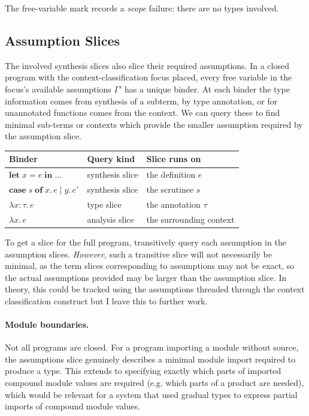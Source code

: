 The free-variable mark records a \emph{scope} failure: there are no types involved.

\subsection{\no Assumption Slices}
\label{sec:marking-assumption-slices}

The involved synthesis slices also slice their required assumptions. In a closed program with the context-classification focus placed,
every free variable in the focus's available assumptions $\Gamma'$ has a unique binder. At each binder the type information comes from synthesis of a subterm, by type annotation, or for unannotated functions comes from the context. We can query these to find minimal sub-terms or contexts which provide the smaller assumption required by the assumption slice.

\begin{center}
\small
\begin{tabular}{lll}
\toprule
\textbf{Binder} & \textbf{Query kind} & \textbf{Slice runs on} \\
\midrule
$\mathbf{let}\;x = e\;\mathbf{in}\;\ldots$            & synthesis slice & the definition $e$ \\
$\mathbf{case}\;s\;\mathbf{of}\;x.\,e \mid y.\,e'$    & synthesis slice & the scrutinee $s$ \\
$\lambda x{:}\tau.\,e$                                & type slice & the annotation $\tau$ \\
$\lambda x.\,e$                                       & analysis slice & the surrounding context \\
\bottomrule
\end{tabular}
\end{center}

To get a slice for the full program, transitively query each assumption in the assumption slices. \textit{However}, such a transitive slice will not necessarily be minimal, as the term slices corresponding to assumptions may not be exact, so the actual assumptions provided may be larger than the assumption slice. In theory, this could be tracked using the assumptions threaded through the context classification construct but I leave this to further work.

\paragraph{Module boundaries.}
Not all programs are closed. For a program importing a module without source, the assumptions slice genuinely describes a minimal module import required to produce a type. This extends to specifying exactly which parts of imported compound module values are required (e.g. which parts of a product are needed), which would be relevant for a system that used gradual types to express partial imports of compound module values.

\clearpage

